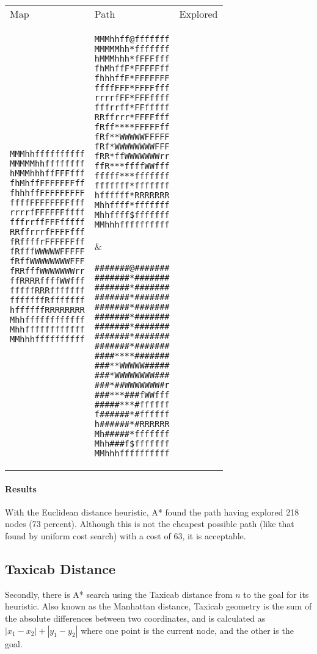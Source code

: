 \documentclass[12pt, article]{scrartcl}
\begin{document}
\begin{tabular}{p{2in} p{2in} p{2in}}
Map & Path & Explored \\

\begin{verbatim}
MMMhhffffffffff
MMMMMhhffffffff
hMMMhhhffFFFfff
fhMhffFFFFFFFff
fhhhffFFFFFFFFF
ffffFFFFFFFFfff
rrrrfFFFFFFffff
fffrrffFFFfffff
RRffrrrfFFFFfff
fRffffrFFFFFFff
fRfffWWWWWFFFFF
fRffWWWWWWWWFFF
fRRfffWWWWWWWrr
ffRRRRffffWWfff
fffffRRRfffffff
fffffffRfffffff
hffffffRRRRRRRR
Mhhffffffffffff
Mhhffffffffffff
MMhhhffffffffff
\end{verbatim}
&
\begin{verbatim}
MMMhhff@fffffff
MMMMMhh*fffffff
hMMMhhh*fFFFfff
fhMhffF*FFFFFff
fhhhffF*FFFFFFF
ffffFFF*FFFFfff
rrrrfFF*FFFffff
fffrrff*FFfffff
RRffrrr*FFFFfff
fRff****FFFFFff
fRf**WWWWWFFFFF
fRf*WWWWWWWWFFF
fRR*ffWWWWWWWrr
ffR***ffffWWfff
fffff***fffffff
fffffff*fffffff
hffffff*RRRRRRR
Mhhffff*fffffff
Mhhffff$fffffff
MMhhhffffffffff
\end{verbatim}
&
\begin{verbatim}
#######@#######
#######*#######
#######*#######
#######*#######
#######*#######
#######*#######
#######*#######
#######*#######
#######*#######
####****#######
###**WWWWW#####
###*WWWWWWWW###
###*##WWWWWWW#r
###***###fWWfff
#####***#ffffff
f######*#ffffff
h######*#RRRRRR
Mh#####*fffffff
Mhh###f$fffffff
MMhhhffffffffff
\end{verbatim}
\end{tabular}
\paragraph{Results}
With the Euclidean distance heuristic, A* found the path having explored 218 nodes (73 percent). Although this is not the cheapest possible path (like that found by uniform cost search) with a cost of 63, it is acceptable. \\

\subsection{Taxicab Distance}
Secondly, there is A* search using the Taxicab distance from $n$ to the goal for its heuristic. Also known as the Manhattan distance, Taxicab geometry is the sum of the absolute differences between two coordinates, and is calculated as $|x_1-x_2| + |y_1-y_2|$ where one point is the current node, and the other is the goal.\\
\end{document}
